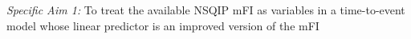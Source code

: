 \emph{Specific Aim 1:} To treat the available NSQIP mFI as variables in a time-to-event model whose linear predictor is an improved version of the mFI